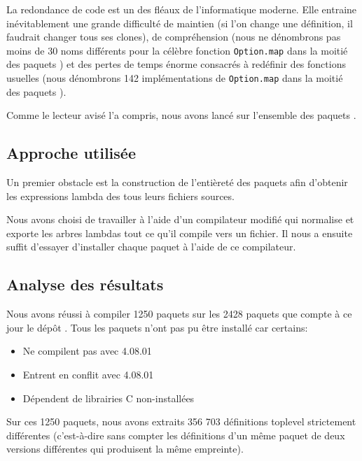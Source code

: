 
La redondance de code est un des fléaux de l'informatique moderne. Elle entraine inévitablement une grande difficulté de maintien (si l'on change une définition, il faudrait changer tous ses clones), de compréhension (nous ne dénombrons pas moins de 30 noms différents pour la célèbre fonction \verb|Option.map| dans la moitié des paquets \Opam) et des pertes de temps énorme consacrés à redéfinir des fonctions usuelles (nous dénombrons 142 implémentations de \verb|Option.map| dans la moitié des paquets \Opam).

Comme le lecteur avisé l'a compris, nous avons lancé {\Asak} sur l'ensemble des paquets {\Opam}.

\subsection{Approche utilisée}

Un premier obstacle est la construction de l'entièreté des paquets {\Opam} afin d'obtenir les expressions lambda des tous leurs fichiers sources.

Nous avons choisi de travailler à l'aide d'un compilateur modifié qui normalise et exporte les arbres lambdas tout ce qu'il compile vers un fichier. Il nous a ensuite suffit d'essayer d'installer chaque paquet {\Opam} à l'aide de ce compilateur.

\subsection{Analyse des résultats}

Nous avons réussi à compiler 1250 paquets sur les 2428 paquets que compte à ce jour le dépôt {\Opam}. Tous les paquets n'ont pas pu être installé car certains:

\begin{itemize}
\item Ne compilent pas avec {\OCaml} 4.08.01
\item Entrent en conflit avec {\OCaml} 4.08.01
\item Dépendent de librairies C non-installées
\end{itemize}

Sur ces 1250 paquets, nous avons extraits 356 703 définitions toplevel strictement différentes (c'est-à-dire sans compter les définitions d'un même paquet de deux versions différentes qui produisent la même empreinte).

